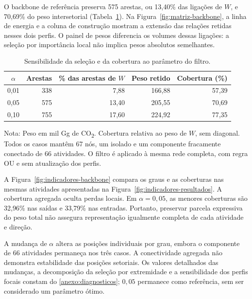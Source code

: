 O backbone de referência preserva 575 arestas, ou 13,40\% das ligações de $W$, e 70,69\% do peso intersetorial (Tabela~\ref{tab:sensibilidade-backbone}). Na Figura~\ref{fig:matriz-backbone}, a linha de energia e a coluna de construção mostram a extensão das relações retidas nesses dois perfis. O painel de pesos diferencia os volumes dessas ligações: a seleção por importância local não implica pesos absolutos semelhantes.

\begin{table}[htbp]
\centering
\caption{Sensibilidade da seleção e da cobertura ao parâmetro do filtro.}
\label{tab:sensibilidade-backbone}
\small
\begin{tabular}{@{}crrrr@{}}
\toprule
$\alpha$ & Arestas & \% das arestas de $W$ & Peso retido & Cobertura (\%) \\
\midrule
0,01 & 338 & 7,88 & 166,88 & 57,39 \\
0,05 & 575 & 13,40 & 205,55 & 70,69 \\
0,10 & 755 & 17,60 & 224,92 & 77,35 \\
\bottomrule
\end{tabular}
\begin{notas}
Nota: Peso em mil Gg de CO\textsubscript{2}. Cobertura relativa ao peso de $W$, sem diagonal. Todos os casos mantêm 67 nós, um isolado e um componente fracamente conectado de 66 atividades. O filtro é aplicado à mesma rede completa, com regra OU e sem atualização dos perfis.
\end{notas}
\end{table}

A Figura~\ref{fig:indicadores-backbone} compara os graus e as coberturas nas mesmas atividades apresentadas na Figura~\ref{fig:indicadores-resultados}. A cobertura agregada oculta perdas locais. Em $\alpha=0{,}05$, as menores coberturas são 32,96\% nas saídas e 33,79\% nas entradas. Portanto, preservar parcela expressiva do peso total não assegura representação igualmente completa de cada atividade e direção.

A mudança de $\alpha$ altera as posições individuais por grau, embora o componente de 66 atividades permaneça nos três casos. A conectividade agregada não demonstra estabilidade das posições setoriais. Os valores detalhados das mudanças, a decomposição da seleção por extremidade e a sensibilidade dos perfis focais constam do \ref{anexo:diagnosticos}; $0{,}05$ permanece como referência, sem ser considerado um parâmetro ótimo.





